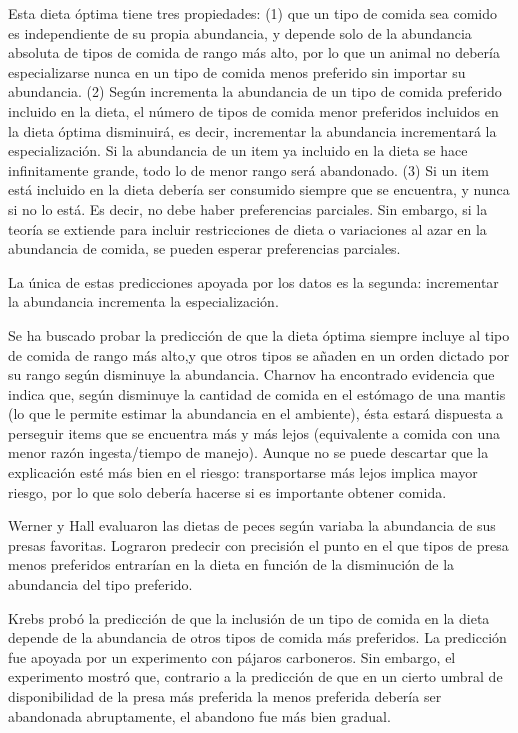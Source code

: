 \documentclass[a4paper,12pt]{article}
\begin{document}
Esta dieta óptima tiene tres propiedades: (1) que un tipo de comida sea comido es independiente de su propia abundancia, y depende solo de la abundancia absoluta de tipos de comida de rango más alto, por lo que un animal no debería especializarse nunca en un tipo de comida menos preferido sin importar su abundancia. (2) Según incrementa la abundancia de un tipo de comida preferido incluido en la dieta, el número de tipos de comida menor preferidos incluidos en la dieta óptima disminuirá, es decir, incrementar la abundancia incrementará la especialización. Si la abundancia de un item ya incluido en la dieta se hace infinitamente grande, todo lo de menor rango será abandonado. (3) Si un item está incluido en la dieta debería ser consumido siempre que se encuentra, y nunca si no lo está. Es decir, no debe haber preferencias parciales. Sin embargo, si la teoría se extiende para incluir restricciones de dieta o variaciones al azar en la abundancia de comida, se pueden esperar preferencias parciales.

La única de estas predicciones apoyada por los datos es la segunda: incrementar la abundancia incrementa la especialización.

Se ha buscado probar la predicción de que la dieta óptima siempre incluye al tipo de comida de rango más alto,y que otros tipos se añaden en un orden dictado por su rango según disminuye la abundancia. Charnov ha encontrado evidencia que indica que, según disminuye la cantidad de comida en el estómago de una mantis (lo que le permite estimar la abundancia en el ambiente), ésta estará dispuesta a perseguir items que se encuentra más y más lejos (equivalente a comida con una menor razón ingesta/tiempo de manejo). Aunque no se puede descartar que la explicación esté más bien en el riesgo: transportarse más lejos implica mayor riesgo, por lo que solo debería hacerse si es importante obtener comida.

Werner y Hall evaluaron las dietas de peces según variaba la abundancia de sus presas favoritas. Lograron predecir con precisión el punto en el que tipos de presa menos preferidos entrarían en la dieta en función de la disminución de la abundancia del tipo preferido.

Krebs probó la predicción de que la inclusión de un tipo de comida en la dieta depende de la abundancia de otros tipos de comida más preferidos. La predicción fue apoyada por un experimento con pájaros carboneros. Sin embargo, el experimento mostró que, contrario a la predicción de que en un cierto umbral de disponibilidad de la presa más preferida la menos preferida debería ser abandonada abruptamente, el abandono fue más bien gradual.
\end{document}
